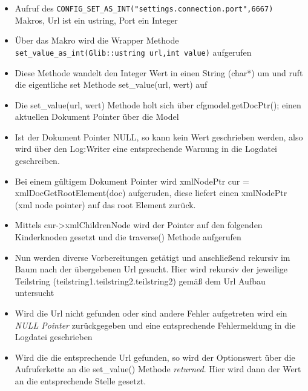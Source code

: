 \begin{itemize}

    \item Aufruf des \verb+CONFIG_SET_AS_INT("settings.connection.port",6667)+ Makros, Url ist ein ustring, Port ein Integer
    \item Über das Makro wird die Wrapper Methode \verb+set_value_as_int(Glib::ustring url,int value)+ aufgerufen
    \item Diese Methode wandelt den Integer Wert in einen String (char*) um und ruft die eigentliche set Methode 
          set\_value(url, wert) auf
    \item Die set\_value(url, wert) Methode holt sich über cfgmodel.getDocPtr(); einen aktuellen Dokument Pointer über die Model
    \item Ist der Dokument Pointer NULL, so kann kein Wert geschrieben werden, also wird über den Log:Writer
          eine entsprechende Warnung in die Logdatei geschreiben.
    \item Bei einem gültigem Dokument Pointer wird  xmlNodePtr cur = xmlDocGetRootElement(doc) aufgeruden,
          diese liefert einen xmlNodePtr (xml node pointer) auf das root Element zurück.
    \item Mittels cur->xmlChildrenNode wird der Pointer auf den folgenden Kinderknoden gesetzt und die traverse() Methode aufgerufen
     \item Nun werden diverse Vorbereitungen getätigt und anschließend rekursiv im Baum nach der übergebenen Url gesucht. Hier wird rekursiv
     der jeweilige Teilstring (teilstring1.teilstring2.teilstring2) gemäß dem Url Aufbau untersucht
           
     \item Wird die Url nicht gefunden oder sind andere Fehler aufgetreten wird ein \emph{NULL Pointer} zurückgegeben
                  und eine entsprechende Fehlermeldung in die Logdatei geschrieben
     \item Wird die die entsprechende Url gefunden, so wird der Optionswert über die Aufruferkette an die set\_value() Methode \emph{returned}.
     Hier wird dann der Wert an die entsprechende Stelle gesetzt.  
\end{itemize}




